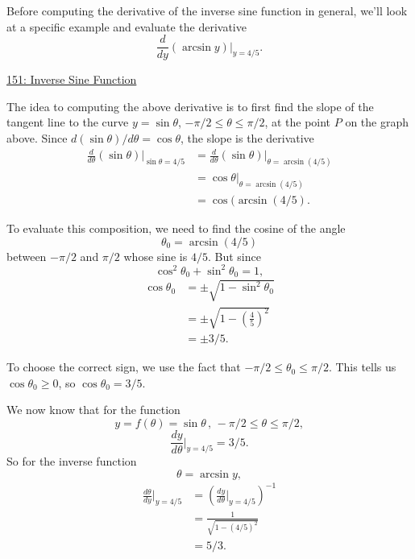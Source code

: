 \documentclass{ximera}
\begin{document}
\begin{example} \label{ExLKDFrsfD}
Before computing the derivative of the inverse sine function in general, we'll look at a specific example and evaluate the derivative
\[
   \frac{d}{dy} \left(  \arcsin y \right) \Big|_{y=4/5} .
\]

\begin{onlineOnly}
    \begin{center}
\end{center}
\end{onlineOnly}

\href{https://www.desmos.com/calculator/alp2mnxqhc}{151: Inverse Sine Function}

The idea to computing the above derivative is to first find the slope of the tangent line to the curve $y=\sin\theta$, $-\pi/2 \leq \theta \leq \pi/2$, at the point $P$ on the graph above. Since $d(\sin\theta)/d\theta = \cos\theta$, the slope is the derivative
\begin{align*}
    \frac{d}{d\theta} \left(\sin\theta \right) \Big|_{\sin\theta = 4/5} &=  \frac{d}{d\theta} \left(\sin\theta \right) \Big|_{\theta = \arcsin(4/5)}  \\
                         &= \cos\theta        \Big|_{\theta = \arcsin(4/5)}  \\                                                       
 & = \cos (\arcsin(4/5).
\end{align*}

To evaluate this composition, we need to find the cosine of the angle 
\[
    \theta_0 = \arcsin(4/5)
\]
between $-\pi/2$ and $\pi/2$ whose sine is $4/5$. But since 
\[
  \cos^2\theta_0 + \sin^2\theta_0 = 1 ,
\] 
\begin{align*}
  \cos\theta_0 &= \pm \sqrt{1-\sin^2\theta_0} \\
                      &= \pm \sqrt{1-\left(\frac{4}{5}\right)^2} \\
                      &= \pm 3/5 .
\end{align*}

To choose the correct sign, we use the fact that $-\pi/2 \leq \theta_0 \leq \pi/2$. This tells us $\cos\theta_0 \geq 0$, so $\cos\theta_0 = 3/5$.

We now know that for the function
\[
  y = f(\theta) = \sin\theta \, , \, -\pi/2 \leq \theta \leq \pi/2 , 
\]
\[
    \frac{dy}{d\theta}\Big|_{y=4/5} = 3/5.
\]
So for the inverse function
\[
     \theta = \arcsin y ,
\]
\begin{align*}
 \frac{d\theta}{dy}\Big|_{y=4/5} &= \left( \frac{dy}{d\theta}\Big|_{y=4/5} \right)^{-1} \\
                                                & =\frac{1}{\sqrt{1-(4/5)^2}}  \\
                                                & = 5/3 .
\end{align*}

\end{example}
\end{document}
